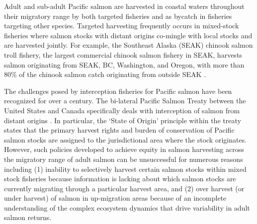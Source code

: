Adult and sub-adult Pacific salmon are harvested in coastal waters throughout
their migratory range by both targeted fisheries and as bycatch in fisheries
targeting other species. Targeted harvesting frequently occurs in mixed-stock
fisheries where salmon stocks with distant origins co-mingle with local stocks
and are harvested jointly. For example, the Southeast Alaska (SEAK) chinook
salmon troll fishery, the largest commercial chinook salmon fishery in SEAK,
harvests salmon originating from SEAK, BC, Washington, and Oregon, with more
than 80\% of the chinook salmon catch originating from outside SEAK
\citep{Templin2004}.

The challenges posed by interception fisheries for Pacific salmon have been
recognized for over a century. The bi-lateral Pacific Salmon Treaty between the
United States and Canada specifically deals with interception of salmon from
distant origins \citep{Knight2000, Noakes2005b}. In particular, the `State of
Origin' principle within the treaty states that the primary harvest rights and
burden of conservation of Pacific salmon stocks are assigned to the
jurisdictional area where the stock originates. However, such policies developed
to achieve equity in salmon harvesting across the migratory range of adult
salmon can be unsuccessful for numerous reasons including (1) inability to
selectively harvest certain salmon stocks within mixed stock fisheries because
information is lacking about which salmon stocks are currently migrating through
a particular harvest area, and (2) over harvest (or under harvest) of salmon in
up-migration areas because of an incomplete understanding of the complex
ecosystem dynamics that drive variability in adult salmon returns.

